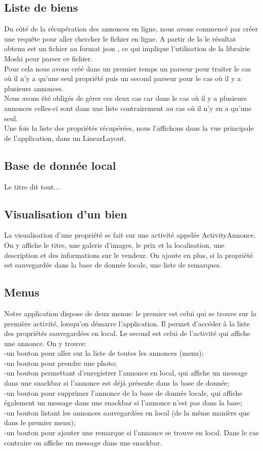 \documentclass[a4paper,12pt]{article} %
\begin{document}
\subsection{Liste de biens}
Du côté de la récupération des annonces en ligne, nous avons commencé par créer une requête pour aller chercher le fichier en ligne.
A partir de la le résultat obtenu est un fichier au format json , ce qui implique l'utilisation de la librairie Moshi pour parser ce fichier. \\
Pour cela nous avons créé dans un premier temps un parseur pour traiter le cas où il n'y a qu'une seul propriété puis un second parseur pour le cas où il y a plusieurs annonces.\\
Nous avons été obligés de gérer ces deux cas car dans le cas où il y a plusieurs annonces celles-ci sont dans une liste contrairement au cas où il n'y en a qu'une seul.\\
Une fois la liste des propriétés récupérées, nous l'affichons dans la vue principale de l'application, dans un LinearLayout.

\subsection{Base de donnée local}
Le titre dit tout...

\subsection{Visualisation d'un bien}
La visualisation d'une propriété se fait sur une activité appelée ActivityAnnonce.
On y affiche le titre, une galerie d'images, le prix et la localisation, une description et des informations sur le vendeur. On ajoute en plus, si la propriété est sauvegardée dans la base de donnée locale, une liste de remarques.

\subsection{Menus}
Notre application dispose de deux menus: le premier est celui qui se trouve sur la première activité, lorsqu'on démarre l'application. Il permet d'accéder à la liste des propriétés sauvegardées en local. Le second est celui de l'activité qui affiche une annonce. On y trouve:\\
    -un bouton pour aller sur la liste de toutes les annonces (menu);\\
    -un bouton pour prendre une photo;\\
    -un bouton permettant d'enregistrer l'annonce en local, qui affiche un message dans une snackbar si l'annonce est déjà présente dans la base de donnée;\\
    -un bouton pour supprimer l'annonce de la base de donnée locale, qui affiche également un message dans une snackbar si l'annonce n'est pas dans la base;\\
    -un bouton listant les annonces sauvegardées en local (de la même manière que dans le premier menu);\\
    -un bouton pour ajouter une remarque si l'annonce se trouve en local. Dans le cas contraire on affiche un message dans une snackbar.
\end{document}
